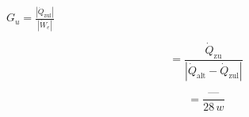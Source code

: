 

\item[d)] \( G_{u} = \frac{\left| \dot{Q}_{\text{zul}} \right|}{\left| \dot{W}_{e} \right|} \)
    
    \[
    = \frac{\dot{Q}_{\text{zu}}}{\left| \dot{Q}_{\text{alt}} - \dot{Q}_{\text{zul}} \right|}
    \]
    
    \[
    = \frac{\text{---}}{28 \, w}
    \]